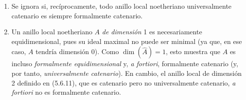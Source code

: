 \begin{remarks}[7.1.12]
\label{IV.2.s7.1.12-fr}
\begin{enumerate}
\item[(i)] Se ignora si, recíprocamente, todo
anillo local noetheriano universalmente catenario
es siempre formalmente catenario.
\item[(ii)] Un anillo local noetheriano $A$
\emph{de dimensión} 1 es necesariamente
equidimensional, pues su ideal maximal no puede
ser minimal (ya que, en ese caso, $A$ tendría
dimensión 0). Como $\dim(\widehat A)=1$,
esto muestra que $A$ es incluso
\emph{formalmente equidimensional} y, \emph{a
fortiori}, formalmente catenario (y, por tanto,
\emph{universalmente catenario}). En cambio,
el anillo local de dimensión 2 definido en
(5.6.11), que es catenario pero no universalmente
catenario, \emph{a fortiori} no es formalmente
catenario.
\end{enumerate}
\end{remarks}

